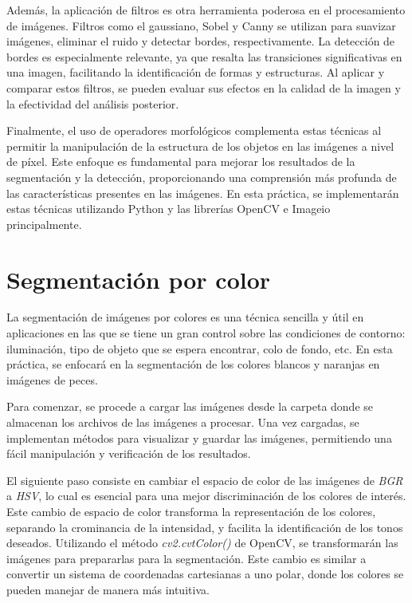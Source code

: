 \documentclass[a4paper,12pt]{article}
\begin{document}
{\vspace{0.5cm}
Además, la aplicación de filtros es otra herramienta poderosa en el procesamiento de imágenes. Filtros como el gaussiano, 
Sobel y Canny se utilizan para suavizar imágenes, eliminar el ruido y detectar bordes, respectivamente. La detección de bordes
es especialmente relevante, ya que resalta las transiciones significativas en una imagen, facilitando la identificación de
  formas y estructuras. Al aplicar y comparar estos filtros, se pueden evaluar sus efectos en la calidad de la imagen y la
efectividad del análisis posterior.

\vspace{0.5cm}
Finalmente, el uso de operadores morfológicos complementa estas técnicas al permitir la manipulación de la estructura de los
objetos en las imágenes a nivel de píxel. Este enfoque es fundamental para mejorar los resultados de la segmentación y la 
detección, proporcionando una comprensión más profunda de las características presentes en las imágenes. En esta práctica, 
se implementarán estas técnicas utilizando Python y las librerías OpenCV e Imageio principalmente.

\newpage

\section{Segmentación por color}

La segmentación de imágenes por colores es una técnica sencilla y útil en aplicaciones en las que se tiene un gran control
sobre las condiciones de contorno: iluminación, tipo de objeto que se espera encontrar, colo de fondo, etc.
En esta práctica, se enfocará en la segmentación de los colores blancos
y naranjas en imágenes de peces. 

Para comenzar, se procede a cargar las imágenes desde la carpeta donde se almacenan los archivos de  las imágenes 
a procesar. Una vez cargadas, se implementan métodos para visualizar y guardar las imágenes, permitiendo 
una fácil manipulación y verificación de los resultados.

El siguiente paso consiste en cambiar el espacio de color de las imágenes de \textit{BGR} a \textit{HSV}, lo cual es esencial
para una mejor discriminación de los colores de interés. Este cambio de espacio de color transforma la representación de los 
colores, separando la crominancia de la intensidad, y facilita la identificación de los tonos deseados. Utilizando el método
\textit{cv2.cvtColor()} de OpenCV, se transformarán las imágenes para prepararlas para la segmentación. Este cambio es similar
a convertir un sistema de coordenadas cartesianas a uno polar, donde los colores se pueden manejar de manera más intuitiva.

}
\end{document}
